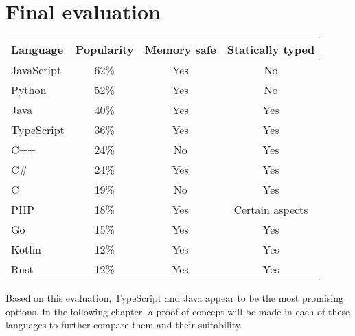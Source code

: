 \section{Final evaluation}

\begin{center}
\begin{tabular}{|l| c c c |}
    \hline
    Language & Popularity & Memory safe & Statically typed \\
    \hline
    JavaScript & 62\% & Yes & No \\
    Python     & 52\% & Yes & No \\
    Java       & 40\% & Yes & Yes \\
    TypeScript & 36\% & Yes & Yes \\
    C++        & 24\% & No  & Yes \\
    C\#        & 24\% & Yes & Yes \\
    C          & 19\% & No  & Yes \\
    PHP        & 18\% & Yes & Certain aspects \\
    Go         & 15\% & Yes & Yes \\
    Kotlin     & 12\% & Yes & Yes \\
    Rust       & 12\% & Yes & Yes \\
    \hline
\end{tabular}
\end{center}

Based on this evaluation, TypeScript and Java appear to be the most promising options. In the following chapter, a proof of concept will be made in each of these languages to further compare them and their suitability.
